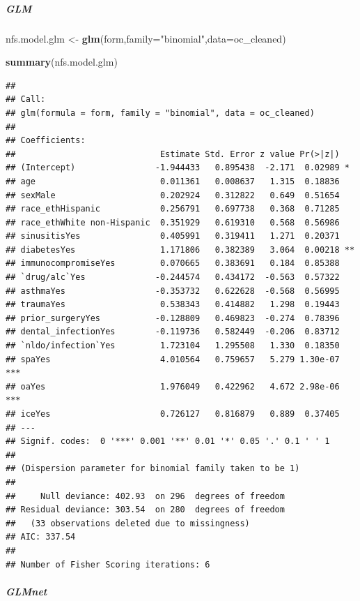\documentclass[
]{article}
\newenvironment{Shaded}{\begin{snugshade}}{\end{snugshade}}
\newcommand{\AttributeTok}[1]{\textcolor[rgb]{0.13,0.29,0.53}{#1}}
\newcommand{\FunctionTok}[1]{\textcolor[rgb]{0.13,0.29,0.53}{\textbf{#1}}}
\newcommand{\NormalTok}[1]{#1}
\newcommand{\OtherTok}[1]{\textcolor[rgb]{0.56,0.35,0.01}{#1}}
\newcommand{\StringTok}[1]{\textcolor[rgb]{0.31,0.60,0.02}{#1}}
\begin{document}
\subparagraph{GLM}\label{glm}

\begin{Shaded}
\begin{Highlighting}[]
\NormalTok{nfs.model.glm }\OtherTok{\textless{}{-}} \FunctionTok{glm}\NormalTok{(form,}\AttributeTok{family=}\StringTok{"binomial"}\NormalTok{,}\AttributeTok{data=}\NormalTok{oc\_cleaned)}

\FunctionTok{summary}\NormalTok{(nfs.model.glm)}
\end{Highlighting}
\end{Shaded}

\begin{verbatim}
## 
## Call:
## glm(formula = form, family = "binomial", data = oc_cleaned)
## 
## Coefficients:
##                             Estimate Std. Error z value Pr(>|z|)    
## (Intercept)                -1.944433   0.895438  -2.171  0.02989 *  
## age                         0.011361   0.008637   1.315  0.18836    
## sexMale                     0.202924   0.312822   0.649  0.51654    
## race_ethHispanic            0.256791   0.697738   0.368  0.71285    
## race_ethWhite non-Hispanic  0.351929   0.619310   0.568  0.56986    
## sinusitisYes                0.405991   0.319411   1.271  0.20371    
## diabetesYes                 1.171806   0.382389   3.064  0.00218 ** 
## immunocompromiseYes         0.070665   0.383691   0.184  0.85388    
## `drug/alc`Yes              -0.244574   0.434172  -0.563  0.57322    
## asthmaYes                  -0.353732   0.622628  -0.568  0.56995    
## traumaYes                   0.538343   0.414882   1.298  0.19443    
## prior_surgeryYes           -0.128809   0.469823  -0.274  0.78396    
## dental_infectionYes        -0.119736   0.582449  -0.206  0.83712    
## `nldo/infection`Yes         1.723104   1.295508   1.330  0.18350    
## spaYes                      4.010564   0.759657   5.279 1.30e-07 ***
## oaYes                       1.976049   0.422962   4.672 2.98e-06 ***
## iceYes                      0.726127   0.816879   0.889  0.37405    
## ---
## Signif. codes:  0 '***' 0.001 '**' 0.01 '*' 0.05 '.' 0.1 ' ' 1
## 
## (Dispersion parameter for binomial family taken to be 1)
## 
##     Null deviance: 402.93  on 296  degrees of freedom
## Residual deviance: 303.54  on 280  degrees of freedom
##   (33 observations deleted due to missingness)
## AIC: 337.54
## 
## Number of Fisher Scoring iterations: 6
\end{verbatim}

\subparagraph{GLMnet}\label{glmnet}
\end{document}
